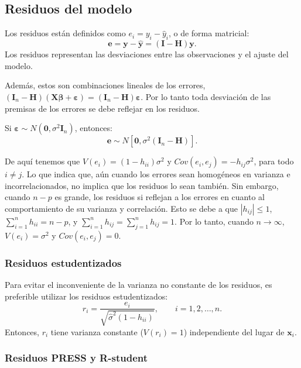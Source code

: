 \documentclass[
]{article}
\begin{document}
\subsection{Residuos del modelo}\label{residuos-del-modelo}

Los residuos están definidos como \(e_{i} = y_{i}- \widehat{y}_{i}\), o de forma matricial:
\[
\boldsymbol e= \boldsymbol y- \widehat{\boldsymbol y}= (\boldsymbol I- \boldsymbol H)\boldsymbol y.
\]
Los residuos representan las desviaciones entre las observaciones y el ajuste del modelo.

Además, estos son combinaciones lineales de los errores, \((\boldsymbol I_{n} - \boldsymbol H)(\boldsymbol X\boldsymbol \beta+\boldsymbol \varepsilon) = (\boldsymbol I_{n} - \boldsymbol H)\boldsymbol \varepsilon\). Por lo tanto toda desviación de las premisas de los errores se debe reflejar en los residuos.

Si \(\boldsymbol \varepsilon\sim N(\boldsymbol 0,\sigma^{2}\boldsymbol I_{n})\), entonces:
\[
\boldsymbol e\sim N \left[ \boldsymbol 0, \sigma^{2}(\boldsymbol I_{n} - \boldsymbol H)  \right].
\]

De aquí tenemos que \(V(e_{i}) = (1-h_{ii})\sigma^{2}\) y \(Cov(e_{i},e_{j}) = - h_{ij}\sigma^{2}\), para todo \(i \neq j\). Lo que indica que, aún cuando los errores sean homogéneos en varianza e incorrelacionados, no implica que los residuos lo sean también. Sin embargo, cuando \(n-p\) es grande, los residuos si reflejan a los errores en cuanto al comportamiento de su varianza y correlación. Esto se debe a que \(|h_{ij}| \leq 1\), \(\sum_{i=1}^{n}h_{ii} = n-p\), y \(\sum_{i=1}^{n}h_{ij}=\sum_{j=1}^{n}h_{ij}=1\). Por lo tanto, cuando \(n\rightarrow \infty\), \(V(e_{i}) = \sigma^{2}\) y \(Cov(e_{i},e_{j}) = 0\).

\subsubsection{Residuos estudentizados}\label{residuos-estudentizados}

Para evitar el inconveniente de la varianza no constante de los residuos, es preferible utilizar los residuos estudentizados:
\[
r_{i} = \frac{e_{i}}{\sqrt{\hat{\sigma}^{2}(1-h_{ii})}}, \qquad i=1,2,\ldots,n.
\]
Entonces, \(r_{i}\) tiene varianza constante (\(V(r_{i})=1\)) independiente del lugar de \(\boldsymbol x_{i}\).

\subsubsection{Residuos PRESS y R-student}\label{residuos-press-y-r-student}
\end{document}
